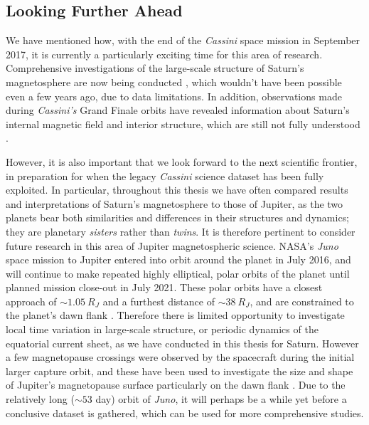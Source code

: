 \subsection{Looking Further Ahead}
We have mentioned how, with the end of the \textit{Cassini} space mission in September 2017, it is currently a particularly exciting time for this area of research. Comprehensive investigations of the large-scale structure of Saturn's magnetosphere are now being conducted \citep[e.g.][]{sergis2017,wilson2017}, which wouldn't have been possible even a few years ago, due to data limitations. In addition, observations made during \textit{Cassini's} Grand Finale orbits have revealed information about Saturn's internal magnetic field and interior structure, which are still not fully understood \citep[e.g.][]{dougherty2018}. 

However, it is also important that we look forward to the next scientific frontier, in preparation for when the legacy \textit{Cassini} science dataset has been fully exploited. In particular, throughout this thesis we have often compared results and interpretations of Saturn's magnetosphere to those of Jupiter, as the two planets bear both similarities and differences in their structures and dynamics; they are planetary \textit{sisters} rather than \textit{twins}. It is therefore pertinent to consider future research in this area of Jupiter magnetospheric science. NASA's \textit{Juno} space mission to Jupiter \citep{bolton2017} entered into orbit around the planet in July 2016, and will continue to make repeated highly elliptical, polar orbits of the planet until planned mission close-out in July 2021. These polar orbits have a closest approach of ${\sim}\SI{1.05}{R_J}$ and a furthest distance of ${\sim}\SI{38}{R_J}$, and are constrained to the planet's dawn flank \citep{bagenal2014}. Therefore there is limited opportunity to investigate local time variation in large-scale structure, or periodic dynamics of the equatorial current sheet, as we have conducted in this thesis for Saturn. However a few magnetopause crossings were observed by the spacecraft during the initial larger capture orbit, and these have been used to investigate the size and shape of Jupiter's magnetopause surface particularly on the dawn flank \citep{gershman2017}. Due to the relatively long (${\sim}{53}$ day) orbit of \textit{Juno}, it will perhaps be a while yet before a conclusive dataset is gathered, which can be used for more comprehensive studies. 

